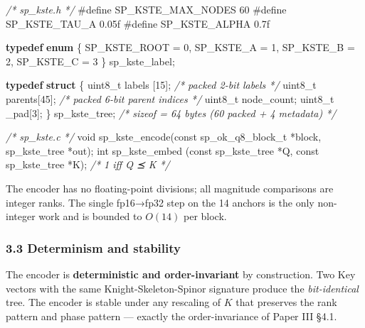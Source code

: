 \documentclass[
  11pt,
]{article}
\newenvironment{Shaded}{}{}
\newcommand{\CommentTok}[1]{\textcolor[rgb]{0.38,0.63,0.69}{\textit{#1}}}
\newcommand{\DataTypeTok}[1]{\textcolor[rgb]{0.56,0.13,0.00}{#1}}
\newcommand{\DecValTok}[1]{\textcolor[rgb]{0.25,0.63,0.44}{#1}}
\newcommand{\KeywordTok}[1]{\textcolor[rgb]{0.00,0.44,0.13}{\textbf{#1}}}
\newcommand{\NormalTok}[1]{#1}
\newcommand{\PreprocessorTok}[1]{\textcolor[rgb]{0.74,0.48,0.00}{#1}}
\begin{document}
\begin{Shaded}
\begin{Highlighting}[]
\CommentTok{/* sp\_kste.h */}
\PreprocessorTok{\#define SP\_KSTE\_MAX\_NODES   60}
\PreprocessorTok{\#define SP\_KSTE\_TAU\_A       0.05f}
\PreprocessorTok{\#define SP\_KSTE\_ALPHA       0.7f}

\KeywordTok{typedef} \KeywordTok{enum}\NormalTok{ \{ SP\_KSTE\_ROOT = }\DecValTok{0}\NormalTok{, SP\_KSTE\_A = }\DecValTok{1}\NormalTok{, SP\_KSTE\_B = }\DecValTok{2}\NormalTok{, SP\_KSTE\_C = }\DecValTok{3}\NormalTok{ \} sp\_kste\_label;}

\KeywordTok{typedef} \KeywordTok{struct}\NormalTok{ \{}
    \DataTypeTok{uint8\_t}\NormalTok{ labels [}\DecValTok{15}\NormalTok{];   }\CommentTok{/* packed 2{-}bit labels */}
    \DataTypeTok{uint8\_t}\NormalTok{ parents[}\DecValTok{45}\NormalTok{];   }\CommentTok{/* packed 6{-}bit parent indices */}
    \DataTypeTok{uint8\_t}\NormalTok{ node\_count;}
    \DataTypeTok{uint8\_t}\NormalTok{ \_pad[}\DecValTok{3}\NormalTok{];}
\NormalTok{\} sp\_kste\_tree;            }\CommentTok{/* sizeof = 64 bytes (60 packed + 4 metadata) */}

\CommentTok{/* sp\_kste.c */}
\DataTypeTok{void}\NormalTok{ sp\_kste\_encode(}\DataTypeTok{const}\NormalTok{ sp\_ok\_q8\_block\_t *block, sp\_kste\_tree *out);}
\DataTypeTok{int}\NormalTok{  sp\_kste\_embed (}\DataTypeTok{const}\NormalTok{ sp\_kste\_tree *Q, }\DataTypeTok{const}\NormalTok{ sp\_kste\_tree *K);   }\CommentTok{/* 1 iff Q ⪯ K */}
\end{Highlighting}
\end{Shaded}

The encoder has no floating-point divisions; all magnitude comparisons
are integer ranks. The single fp16→fp32 step on the 14 anchors is the
only non-integer work and is bounded to \(O(14)\) per block.

\hypertarget{determinism-and-stability}{%
\subsubsection{3.3 Determinism and
stability}\label{determinism-and-stability}}

The encoder is \textbf{deterministic and order-invariant} by
construction. Two Key vectors with the same Knight-Skeleton-Spinor
signature produce the \emph{bit-identical} tree. The encoder is stable
under any rescaling of \(K\) that preserves the rank pattern and phase
pattern --- exactly the order-invariance of Paper III §4.1.
\end{document}
